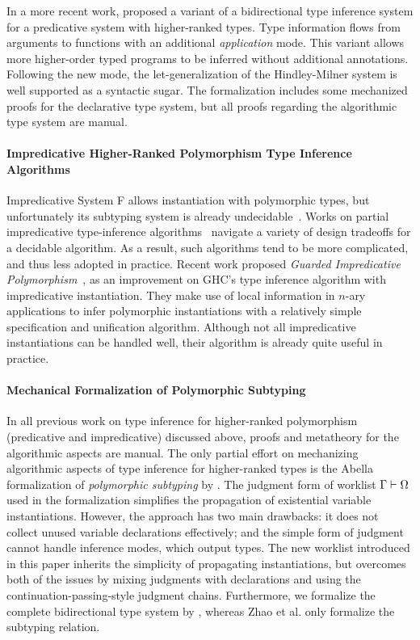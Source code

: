 In a more recent work, \citet{xie2018letarguments} proposed a variant of a
bidirectional type inference system for a predicative system with higher-ranked types.
Type information flows from arguments to
functions with an additional \emph{application} mode. This variant 
allows more higher-order typed programs to be inferred without additional annotations.
Following the new mode, the let-generalization of the Hindley-Milner system
is well supported as a syntactic sugar. The formalization includes some
mechanized proofs for the declarative type system, but all proofs regarding
the algorithmic type system are manual.

\paragraph{Impredicative Higher-Ranked Polymorphism Type Inference Algorithms}
Impredicative System F allows instantiation with polymorphic types,
but unfortunately its subtyping system is already undecidable~\cite{tiuryn1996subtyping}.
Works on partial impredicative type-inference algorithms~\cite{le2003ml,leijen2008hmf,vytiniotis2008fph}
navigate a variety of design tradeoffs for a decidable algorithm.
As a result, such algorithms tend to be more complicated, and thus less adopted in practice.
Recent work proposed \emph{Guarded Impredicative Polymorphism}~\cite{Serrano2018},
as an improvement on GHC's type inference algorithm with impredicative instantiation.
They make use of local information in $n$-ary applications to
infer polymorphic instantiations with a relatively simple specification and unification algorithm.
Although not all impredicative instantiations can be handled well,
their algorithm is already quite useful in practice.

\paragraph{Mechanical Formalization of Polymorphic Subtyping}
In all previous work on type inference for higher-ranked polymorphism
(predicative and impredicative) discussed above, proofs and
metatheory for the algorithmic aspects are manual. The only partial effort on mechanizing algorithmic
aspects of type inference
for higher-ranked types is
the Abella formalization of \emph{polymorphic subtyping} by \citet{itp2018}.
The judgment form of worklist $\Gamma \vdash \Omega$ used in the formalization simplifies
the propagation of existential variable instantiations.
However, the approach has two main drawbacks:
it does not collect unused variable declarations effectively;
and the simple form of judgment cannot handle inference modes, which output types.
The new worklist introduced in this paper inherits the simplicity of propagating instantiations,
but overcomes both of the issues by mixing judgments with declarations
and using the continuation-passing-style judgment chains. Furthermore,
we formalize the complete bidirectional type system by
\citet{dunfield2013complete}, whereas Zhao et al. only formalize
the subtyping relation. 

